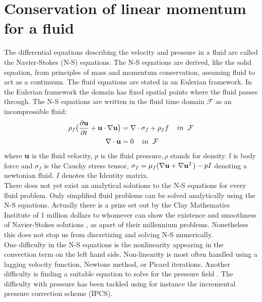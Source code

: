 \section{Conservation of linear momentum for a fluid}
The differential equations describing the velocity and pressure in a fluid are called the Navier-Stokes (N-S) equations. The N-S equations are derived, like the solid equation, from principles of mass and momentum conservation, assuming fluid to act as a continuum.
The fluid equations are stated in an Eulerian framework. In the Eulerian framework the domain has fixed spatial points where the fluid passes through. 
The N-S equations are written in the fluid time domain $\mathcal{F}$ as an incompressible fluid:
\begin{align}
\label{eq:NS}
\rho_f\big( \frac{\partial \bold{u}}{\partial t} +  \bold{u} \cdot \nabla \bold{u}\big) &= \nabla \cdot \sigma_f + \rho_ff  \hspace{4mm} in \hspace{2mm} \mathcal{F}\\
\nabla \cdot \bold{u} &= 0 \hspace{4mm} in \hspace{2mm} \mathcal{F}
\end{align}
where $\bold{u}$ is the fluid velocity, $p$ is the fluid pressure$, \rho$ stands for density. f is body force and $\sigma_f$ is the Cauchy stress tensor, $ \sigma_f = \mu_f (\nabla \bold{u} + \nabla \bold{u}^T)  - pI$ denoting a newtonian fluid. $I$ denotes the Identity matrix. \\

There does not yet exist an analytical solutions to the N-S equations for every fluid problem. Only simplified fluid problems can be solved \cite{White2000} analytically using the N-S equations. Actually there is a prize set out by the Clay Mathematics Institute of 1 million dollars to whomever can show the existence and smoothness of Navier-Stokes solutions \cite{Fefferman2000}, as apart of their millennium problems. 
Nonetheless this does not stop us from discretizing and solving N-S numerically. \\

One difficulty in the N-S equations is the nonlinearity appearing in the convection term on the left hand side. Non-linearity is most often handled using a lagging velocity function, Newtons method, or Picard iterations. Another difficulty is finding a suitable equation to solve for the pressure field \cite{Charlesworth2003}. The difficulty with pressure has been tackled using for instance the incremental pressure correction scheme (IPCS).